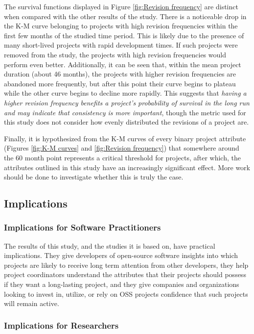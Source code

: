 \documentclass[sigconf,review]{acmart}
\begin{document}
The survival functions displayed in Figure \ref{fig:Revision frequency} are distinct when compared with the other results of the study.
There is a noticeable drop in the K-M curve belonging to projects with high revision frequencies within the first few months of the studied time period.
This is likely due to the presence of many short-lived projects with rapid development times.
If such projects were removed from the study, the projects with high revision frequencies would perform even better.
Additionally, it can be seen that, within the mean project duration (about 46 months), the projects with higher revision frequencies are abandoned more frequently, but after this point their curve begins to plateau while the other curve begins to decline more rapidly.
This suggests that \emph{having a higher revision frequency benefits a project's probability of survival in the long run and may indicate that consistency is more important}, though the metric used for this study does not consider how evenly distributed the revisions of a project are.

Finally, it is hypothesized from the K-M curves of every binary project attribute (Figures \ref{fig:K-M curves} and \ref{fig:Revision frequency}) that somewhere around the 60 month point represents a critical threshold for projects, after which, the attributes outlined in this study have an increasingly significant effect.
More work should be done to investigate whether this is truly the case.

\subsection{Implications} \label{implications}

\subsubsection{Implications for Software Practitioners} 

The results of this study, and the studies it is based on, have practical implications.
They give developers of open-source software insights into which projects are likely to receive long term attention from other developers, they help project coordinators understand the attributes that their projects should possess if they want a long-lasting project, and they give companies and organizations looking to invest in, utilize, or rely on OSS projects confidence that such projects will remain active.

\subsubsection{Implications for Researchers} 
\end{document}
